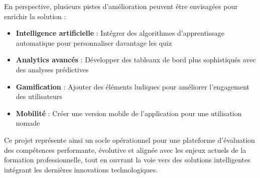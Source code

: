 \documentclass[12pt,a4paper]{report}
\begin{document}
\medskip
\noindent
En perspective, plusieurs pistes d'amélioration peuvent être envisagées pour enrichir la solution :
\begin{itemize}
    \item \textbf{Intelligence artificielle} : Intégrer des algorithmes d'apprentissage automatique pour personnaliser davantage les quiz
    \item \textbf{Analytics avancés} : Développer des tableaux de bord plus sophistiqués avec des analyses prédictives
    \item \textbf{Gamification} : Ajouter des éléments ludiques pour améliorer l'engagement des utilisateurs
    \item \textbf{Mobilité} : Créer une version mobile de l'application pour une utilisation nomade
\end{itemize}

\medskip
\noindent
Ce projet représente ainsi un socle opérationnel pour une plateforme d'évaluation des compétences performante, évolutive et alignée avec les enjeux actuels de la formation professionnelle, tout en ouvrant la voie vers des solutions intelligentes intégrant les dernières innovations technologiques.
\end{document}
